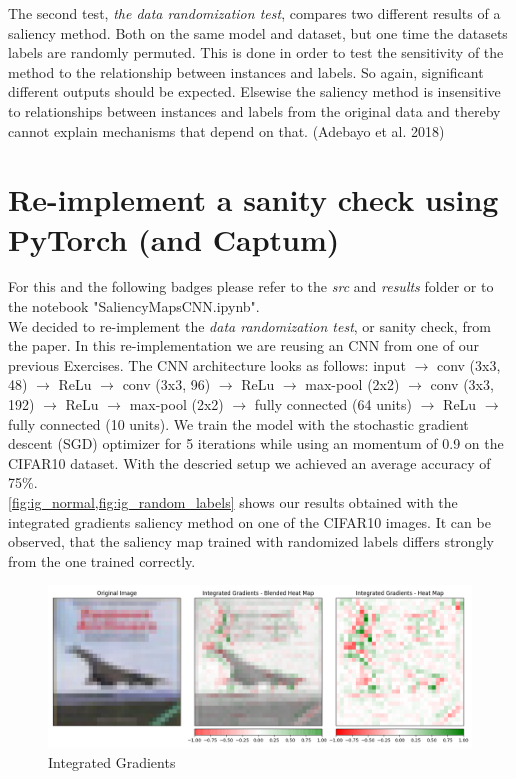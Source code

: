 \documentclass{article}
\begin{document}
The second test, \textit{the data randomization test}, compares two different results of a saliency method. Both on the same model and dataset, but one time the datasets labels are randomly permuted. This is done in order to test the sensitivity of the method to the relationship between instances and labels. So again, significant different outputs should be expected. Elsewise the saliency method is insensitive to relationships between instances and labels from the original data and thereby cannot explain mechanisms that depend on that. (Adebayo et al. 2018) \par

\section{Re-implement a sanity check using PyTorch (and Captum)}
For this and the following badges please refer to the \textit{src} and \textit{results} folder or to the notebook "SaliencyMapsCNN.ipynb".\\

We decided to re-implement the \textit{data randomization test}, or sanity check, from the paper. In this re-implementation we are reusing an CNN from one of our previous Exercises. The CNN architecture looks as follows: input $\to$ conv (3x3, 48) $\to$ ReLu $\to$ conv (3x3, 96) $\to$ ReLu $\to$ max-pool (2x2) $\to$ conv (3x3, 192) $\to$ ReLu $\to$ max-pool (2x2) $\to$ fully connected (64 units) $\to$ ReLu $\to$ fully connected (10 units). We train the model with the stochastic gradient descent (SGD) optimizer for 5 iterations while using an momentum of 0.9 on the CIFAR10 dataset. With the descried setup we achieved an average accuracy of 75\%.\\

\cref{fig:ig_normal,fig:ig_random_labels} shows our results obtained with the integrated gradients saliency method on one of the CIFAR10 images. It can be observed, that the saliency map trained with randomized labels differs strongly from the one trained correctly.

\begin{figure}[h!]
\centering
\includegraphics[width=\textwidth]{results/IG_normal.png}
\caption{Integrated Gradients}
\label{fig:ig_normal}
\end{figure}
\end{document}
